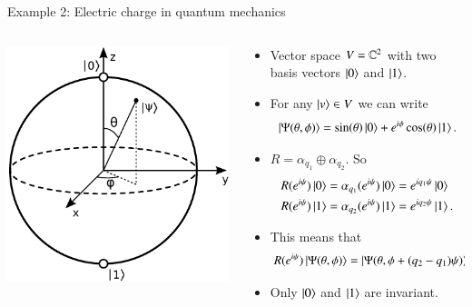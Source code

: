 \documentclass{beamer}
\begin{document}
\begin{frame}{Example 2: Electric charge in quantum mechanics}
\begin{columns}
	\begin{column}{0.4\textwidth}
		\begin{center}
			\includegraphics[width=\textwidth]{Images/Bloch_sphere.pdf}
		\end{center}
	\end{column}
	\begin{column}{0.6\textwidth}
		\begin{itemize}
			\item Vector space $V=\mathbb{C}^2$ with two basis vectors $\ket{0}$ and $\ket{1}$.
			\item For any $\ket{v}\in V$ we can write
			\[\ket{\Psi(\theta,\phi)}=\sin(\theta)\ket{0}+e^{i\phi}\cos(\theta)\ket{1}.\]
			\pause
			\item $R=\alpha_{q_1}\oplus\alpha_{q_2}$. So
			\begin{align*}
			R(e^{i\psi})\ket{0}&=\alpha_{q_1}(e^{i\psi})\ket{0}=e^{i q_1 \psi}\ket{0}\\
			R(e^{i\psi})\ket{1}&=\alpha_{q_2}(e^{i\psi})\ket{1}=e^{i q_2 \psi}\ket{1}.
			\end{align*}
			\pause
			\item This means that
			\[R(e^{i\psi})\ket{\Psi(\theta,\phi)}=\ket{\Psi(\theta,\phi+(q_2-q_1)\psi)}.\]
			\item Only $\ket{0}$ and $\ket{1}$ are invariant.
		\end{itemize}
	\end{column}
\end{columns}
\end{frame}
\end{document}
